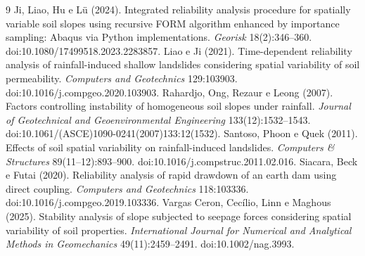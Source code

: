 \documentclass[11pt,a4paper]{article}
\begin{document}
\begin{thebibliography}{9}
 Ji, Liao, Hu e Lü (2024). Integrated reliability analysis procedure for spatially variable soil slopes
using recursive FORM algorithm enhanced by importance sampling: Abaqus via Python implementations. \emph{Georisk}
18(2):346--360. doi:10.1080/17499518.2023.2283857.
 Liao e Ji (2021). Time-dependent reliability analysis of rainfall-induced shallow landslides
considering spatial variability of soil permeability. \emph{Computers and Geotechnics} 129:103903.
doi:10.1016/j.compgeo.2020.103903.
 Rahardjo, Ong, Rezaur e Leong (2007). Factors controlling instability of homogeneous soil slopes
under rainfall. \emph{Journal of Geotechnical and Geoenvironmental Engineering} 133(12):1532--1543.
doi:10.1061/(ASCE)1090-0241(2007)133:12(1532).
 Santoso, Phoon e Quek (2011). Effects of soil spatial variability on rainfall-induced landslides.
\emph{Computers \& Structures} 89(11--12):893--900. doi:10.1016/j.compstruc.2011.02.016.
 Siacara, Beck e Futai (2020). Reliability analysis of rapid drawdown of an earth dam using direct
coupling. \emph{Computers and Geotechnics} 118:103336. doi:10.1016/j.compgeo.2019.103336.
 Vargas Ceron, Cecílio, Linn e Maghous (2025). Stability analysis of slope subjected to seepage forces
considering spatial variability of soil properties. \emph{International Journal for Numerical and Analytical Methods in
Geomechanics} 49(11):2459--2491. doi:10.1002/nag.3993.
\end{thebibliography}
\end{document}
